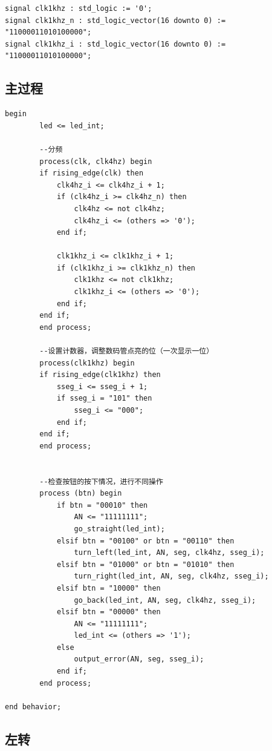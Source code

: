 \documentclass[11pt, a4paper]{article}
\begin{document}
\begin{CJK*}{UTF8}{gbsn}
\begin{verbatim}
signal clk1khz : std_logic := '0';
signal clk1khz_n : std_logic_vector(16 downto 0) := "11000011010100000";
signal clk1khz_i : std_logic_vector(16 downto 0) := "11000011010100000";
  \end{verbatim}

  \subsection{主过程}

  \begin{verbatim}
begin
        led <= led_int;

        --分频
        process(clk, clk4hz) begin
        if rising_edge(clk) then
            clk4hz_i <= clk4hz_i + 1;
            if (clk4hz_i >= clk4hz_n) then
                clk4hz <= not clk4hz;
                clk4hz_i <= (others => '0');
            end if;
            
            clk1khz_i <= clk1khz_i + 1;
            if (clk1khz_i >= clk1khz_n) then
                clk1khz <= not clk1khz;
                clk1khz_i <= (others => '0');
            end if;
        end if;
        end process;

        --设置计数器，调整数码管点亮的位（一次显示一位）
        process(clk1khz) begin
        if rising_edge(clk1khz) then
            sseg_i <= sseg_i + 1;
            if sseg_i = "101" then
                sseg_i <= "000";
            end if;
        end if;
        end process;
        

        --检查按钮的按下情况，进行不同操作
        process (btn) begin
            if btn = "00010" then
                AN <= "11111111";
                go_straight(led_int);
            elsif btn = "00100" or btn = "00110" then 
                turn_left(led_int, AN, seg, clk4hz, sseg_i);
            elsif btn = "01000" or btn = "01010" then
                turn_right(led_int, AN, seg, clk4hz, sseg_i);
            elsif btn = "10000" then
                go_back(led_int, AN, seg, clk4hz, sseg_i);
            elsif btn = "00000" then
                AN <= "11111111";
                led_int <= (others => '1');
            else 
                output_error(AN, seg, sseg_i);
            end if;
        end process;
            
end behavior;

  \end{verbatim}

  \subsection{左转}


\end{CJK*}
\end{document}
